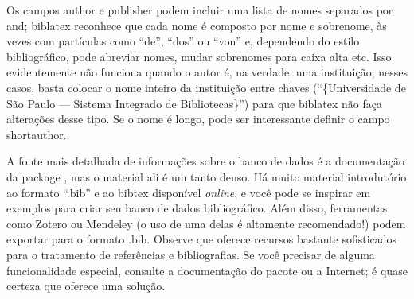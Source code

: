 %
%
%

Os campos \textsf{author} e \textsf{publisher} podem incluir uma lista
de nomes separados por \textsf{and}; biblatex reconhece que cada nome é
composto por nome e sobrenome, às vezes com partículas como ``de'', ``dos''
ou ``von'' e, dependendo do estilo bibliográfico, pode abreviar nomes, mudar
sobrenomes para caixa alta etc. Isso evidentemente não funciona quando o autor
é, na verdade, uma instituição; nesses casos, basta colocar o nome inteiro da
instituição entre chaves (``\{Universidade de São Paulo --- Sistema Integrado
de Bibliotecas\}'') para que biblatex não faça alterações desse tipo. Se o
nome é longo, pode ser interessante definir o campo \textsf{shortauthor}.

A fonte mais detalhada de informações sobre o banco de dados é a documentação
da package  \citep[em especial as seções 2.1.1 e 2.2.2]{biblatex},
mas o material ali é um tanto denso.
Há muito material introdutório ao formato ``.bib'' e ao bibtex disponível
\emph{online}, e você pode se inspirar em exemplos para criar seu banco de
dados bibliográfico. Além disso, ferramentas como Zotero ou
Mendeley (o uso de uma delas é altamente recomendado!)
podem exportar para o formato .bib. Observe que 
 oferece recursos bastante sofisticados para o tratamento de
referências e bibliografias. Se você precisar de alguma funcionalidade
especial, consulte a documentação do pacote ou a Internet; é quase certeza
que  oferece uma solução.


